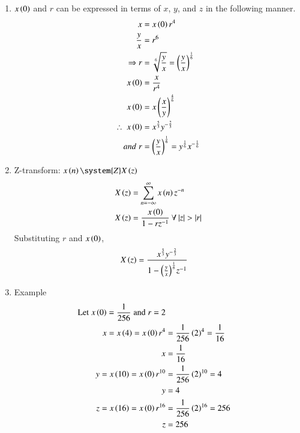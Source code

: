 \documentclass[journal,12pt,twocolumn]{IEEEtran}
\theoremstyle{remark}
\begin{document}
\begin{enumerate}
\item
$x\left(0\right)$ and $r$ can be expressed in terms of $x$, $y$, and $z$ in the following manner.
\begin{align}
 \notag      x&=x\left(0\right)r^4 \\
 \notag    \frac{y}{x}&=r^6 \\
 \Rightarrow r&=\sqrt[6]{\frac{y}{x}}=\left(\frac{y}{x}\right)^{\frac{1}{6}}\\
 \notag    x\left(0\right)&=\frac{x}{r^4}\\
 \notag    x\left(0\right)&=x\left(\frac{x}{y}\right)^{\frac{4}{6}}\\
 \therefore\; x\left(0\right)&=x^{\frac{5}{3}}y^{-\frac{2}{3}} \\
 and\; r&=\left(\frac{y}{x}\right)^{\frac{1}{6}}= y^{\frac{1}{6}}x^{-\frac{1}{6}}
\end{align}
\item 
Z-transform:    $x\brak{n} \system{Z} X\brak{z}$
\begin{align*}
    X\brak{z}&= \sum_{n=-\infty}^{\infty} x\brak{n}z^{-n}\\
    X\brak{z}&=\dfrac{x\brak{0}}{1-rz^{-1}}\: \forall\: |z|>|r|
\end{align*}
Substituting $r$ and $x\left(0\right)$, 
\begin{align*}
     X\left(z\right)&=\dfrac{x^{\frac{5}{3}}y^{-\frac{2}{3}}}{1-{\left(\frac{y}{x}\right)^{\frac{1}{6}}}z^{-1}}
\end{align*}
\item Example 
\begin{align*}
    \text{Let}\;x\left(0\right) =\dfrac{1}{256}\;\text{and}\;r = 2\\     x=x\left(4\right)=x\left(0\right)r^4 &=\frac{1}{256}\left(2\right)^4=\frac{1}{16}\\
     x&=\frac{1}{16} \\
    y=x\left(10\right)=x\left(0\right)r^{10} &=\frac{1}{256}\left(2\right)^{10}=4\\
     y&=4 \\
    z=x\left(16\right)=x\left(0\right)r^{16} &=\frac{1}{256}\left(2\right)^{16}=256\\
     z&=256 \\
\end{align*}
\newpage
\begin{figure}[!h]
    \centering
    \renewcommand\thefigure{1}

\end{figure}
\end{enumerate}
\end{document}

